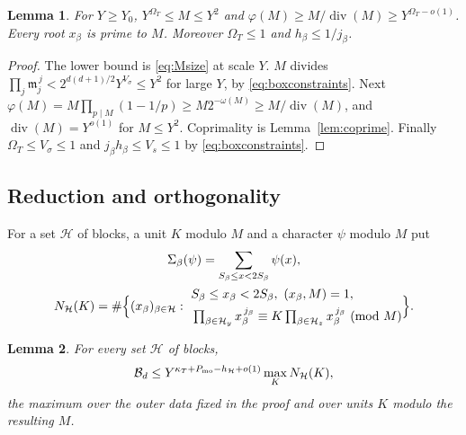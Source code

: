 \documentclass{amsart}
\newtheorem{lemma}{Lemma}[section]
\theoremstyle{definition}
\theoremstyle{plain}
\numberwithin{equation}{section}
\numberwithin{table}{section}
\begin{document}
\begin{lemma}\label{lem:mo:size}
For $Y\ge Y_0$,
$Y^{\Omega_T}\le M\le Y^2$ and $\varphi(M)\ge M/\operatorname{div}(M)\ge Y^{\Omega_T-o(1)}$.
Every root $x_\beta$ is prime to $M$. Moreover
$\Omega_T\le1$ and $h_\beta\le1/j_\beta$.
\end{lemma}

\begin{proof}
The lower bound is \eqref{eq:Msize} at scale $Y$. $M$ divides
 $\prod_j\mathfrak m_j^{\,j}<2^{d(d+1)/2}Y^{V_\sigma}\le Y^2$ for large $Y$, by
\eqref{eq:boxconstraints}. Next
$\varphi(M)=M\prod_{p\mid M}(1-1/p)\ge M2^{-\omega(M)}\ge M/\operatorname{div}(M)$,
and $\operatorname{div}(M)=Y^{o(1)}$ for $M\le Y^2$. Coprimality is
Lemma~\ref{lem:coprime}. Finally $\Omega_T\le V_\sigma\le1$ and
$j_\beta h_\beta\le V_s\le1$ by \eqref{eq:boxconstraints}.
\end{proof}

\subsection{Reduction and orthogonality}\label{sec:mo:red}

For a set $\mathcal H$ of blocks, a unit $K$ modulo $M$ and a character
$\psi$ modulo $M$ put
\begin{equation}\label{eq:mo:N}
 \begin{gathered}
 \Sigma_\beta(\psi)=\sum_{S_\beta\le x<2S_\beta}\psi(x),\\
 N_{\mathcal H}(K)=\#\Bigl\{(x_\beta)_{\beta\in\mathcal H}:\
 \begin{aligned}
 &S_\beta\le x_\beta<2S_\beta,\ (x_\beta,M)=1,\\
 &\textstyle\prod_{\beta\in\mathcal H_y}x_\beta^{\,j_\beta}\equiv
 K\prod_{\beta\in\mathcal H_z}x_\beta^{\,j_\beta}\ (\mathrm{mod}\ M)
 \end{aligned}\Bigr\}.
 \end{gathered}
\end{equation}

\begin{lemma}\label{lem:mo:red}
For every set $\mathcal H$ of blocks,
\[
 \mathcal B_d\le Y^{\kappa_T+P_{\rm mo}-h_{\mathcal H}+o(1)}\max_KN_{\mathcal H}(K),
\]
the maximum over the outer data fixed in the proof and over units $K$
modulo the resulting $M$.
\end{lemma}
\end{document}
